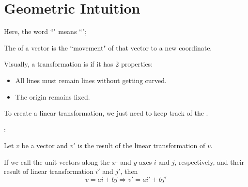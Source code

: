 \chapter{Geometric Intuition}

    \par Here, the word ``" means ``";
    \par The  of a vector is the ``movement" of that 
      vector to a new coordinate.
    \par Visually, a transformation is  if it has 2 properties:
    \begin{itemize}
      \item All lines must remain lines without getting curved.
      \item The origin remains fixed.
    \end{itemize}
    \par To create a linear transformation, we just need to keep track of
      the .
    \par {}:
    \par Let $v$ be a vector and $v'$ is the result of the linear
    transformation of $v$.
    \par If we call the unit vectors along the $x$- and $y$-axes $i$ and $j$,
    respectively, and their result of linear transformation $i'$ and $j'$,
    then
    \begin{equation}
      v = ai + bj \Rightarrow v' = ai' + bj'
    \end{equation}